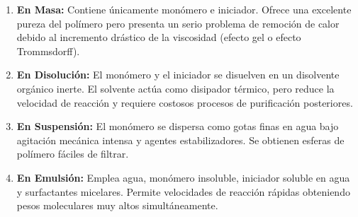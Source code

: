\begin{enumerate}
    \item \textbf{En Masa:} Contiene únicamente monómero e iniciador. Ofrece una excelente pureza del polímero pero presenta un serio problema de remoción de calor debido al incremento drástico de la viscosidad (efecto gel o efecto Trommsdorff).
    \item \textbf{En Disolución:} El monómero y el iniciador se disuelven en un disolvente orgánico inerte. El solvente actúa como disipador térmico, pero reduce la velocidad de reacción y requiere costosos procesos de purificación posteriores.
    \item \textbf{En Suspensión:} El monómero se dispersa como gotas finas en agua bajo agitación mecánica intensa y agentes estabilizadores. Se obtienen esferas de polímero fáciles de filtrar.
    \item \textbf{En Emulsión:} Emplea agua, monómero insoluble, iniciador soluble en agua y surfactantes micelares. Permite velocidades de reacción rápidas obteniendo pesos moleculares muy altos simultáneamente.
\end{enumerate}
